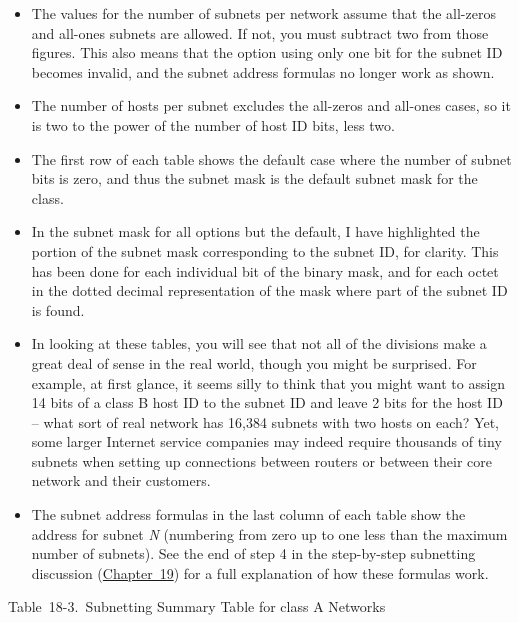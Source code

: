 \begin{itemize}
\item
  The values for the number of subnets per network assume that the
  all-zeros and all-ones subnets are allowed. If not, you must subtract
  two from those figures. This also means that the option using only one
  bit for the subnet ID becomes invalid, and the subnet address formulas
  no longer work as shown.
\item
  The number of hosts per subnet excludes the all-zeros and all-ones
  cases, so it is two to the power of the number of host ID bits, less
  two.
\item
  The first row of each table shows the default case where the number of
  subnet bits is zero, and thus the subnet mask is the default subnet
  mask for the class.
\item
  In the subnet mask for all options but the default, I have highlighted
  the portion of the subnet mask corresponding to the subnet ID, for
  clarity. This has been done for each individual bit of the binary
  mask, and for each octet in the dotted decimal representation of the
  mask where part of the subnet ID is found.
\item
  In looking at these tables, you will see that not all of the divisions
  make a great deal of sense in the real world, though you might be
  surprised. For example, at first glance, it seems silly to think that
  you might want to assign 14 bits of a class B host ID to the subnet ID
  and leave 2 bits for the host ID -- what sort of real network has
  16,384 subnets with two hosts on each? Yet, some larger Internet
  service companies may indeed require thousands of tiny subnets when
  setting up connections between routers or between their core network
  and their customers.
\item
  The subnet address formulas in the last column of each table show the
  address for subnet {\emph{N}} (numbering from zero up to one less than
  the maximum number of subnets). See the end of step 4 in the
  step-by-step subnetting discussion
  (\protect\hyperlink{ch19.html}{Chapter~19}) for a full explanation of
  how these formulas work.
\end{itemize}

\protect\hypertarget{ch18s07.htmlux5cux23subnetting_summary_table_for_class_a_net}{}{}

Table~18-3.~Subnetting Summary Table for class A Networks

